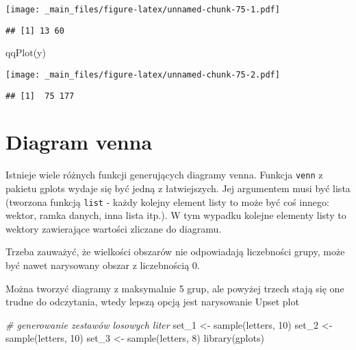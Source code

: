 \documentclass[
]{book}
\newenvironment{Shaded}{\begin{snugshade}}{\end{snugshade}}
\newcommand{\CommentTok}[1]{\textcolor[rgb]{0.56,0.35,0.01}{\textit{#1}}}
\newcommand{\DecValTok}[1]{\textcolor[rgb]{0.00,0.00,0.81}{#1}}
\newcommand{\FunctionTok}[1]{\textcolor[rgb]{0.00,0.00,0.00}{#1}}
\newcommand{\NormalTok}[1]{#1}
\newcommand{\OtherTok}[1]{\textcolor[rgb]{0.56,0.35,0.01}{#1}}
\begin{document}
\texttt{[image: \_main\_files/figure-latex/unnamed-chunk-75-1.pdf]}

\begin{verbatim}
## [1] 13 60
\end{verbatim}

\begin{Shaded}
\begin{Highlighting}[]
\FunctionTok{qqPlot}\NormalTok{(y)}
\end{Highlighting}
\end{Shaded}

\texttt{[image: \_main\_files/figure-latex/unnamed-chunk-75-2.pdf]}

\begin{verbatim}
## [1]  75 177
\end{verbatim}

\hypertarget{diagram-venna}{%
\section{Diagram venna}\label{diagram-venna}}

Istnieje wiele różnych funkcji generujących diagramy venna. Funkcja \texttt{venn} z pakietu gplots wydaje się być jedną z łatwiejszych. Jej argumentem musi być lista (tworzona funkcją \texttt{list} - każdy kolejny element listy to może być coś innego: wektor, ramka danych, inna lista itp.). W tym wypadku kolejne elementy listy to wektory zawierające wartości zliczane do diagramu.

Trzeba zauważyć, że wielkości obszarów nie odpowiadają liczebności grupy, może być nawet narysowany obszar z liczebnością 0.

Można tworzyć diagramy z maksymalnie 5 grup, ale powyżej trzech stają się one trudne do odczytania, wtedy lepszą opcją jest narysowanie Upset plot

\begin{Shaded}
\begin{Highlighting}[]
\CommentTok{\# generowanie zestawów losowych liter}
\NormalTok{set\_1 }\OtherTok{\textless{}{-}} \FunctionTok{sample}\NormalTok{(letters, }\DecValTok{10}\NormalTok{)}
\NormalTok{set\_2 }\OtherTok{\textless{}{-}} \FunctionTok{sample}\NormalTok{(letters, }\DecValTok{10}\NormalTok{)}
\NormalTok{set\_3 }\OtherTok{\textless{}{-}} \FunctionTok{sample}\NormalTok{(letters, }\DecValTok{8}\NormalTok{)}
\FunctionTok{library}\NormalTok{(gplots)}
\end{Highlighting}
\end{Shaded}
\end{document}

